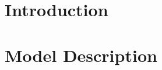 \documentclass[twocolumn,preprintnumbers,amsmath,amssymb,superscriptaddress]{revtex4}
\begin{document}
\maketitle

\section*{Introduction}

















\section*{Model Description}
\end{document}
